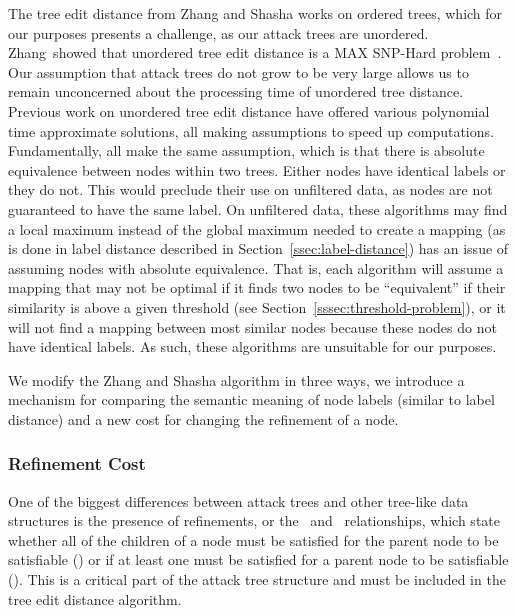 The tree edit distance from Zhang and Shasha works on ordered trees, which for our purposes presents a challenge, as our attack trees are unordered. Zhang~\etal showed that unordered tree edit distance is a MAX SNP-Hard problem~\cite{zhang_max_1994}. Our assumption that attack trees do not grow to be very large allows us to remain unconcerned about the processing time of unordered tree distance. Previous work on unordered tree edit distance have offered various polynomial time approximate solutions, all making assumptions to speed up computations. Fundamentally, all make the same assumption, which is that there is absolute equivalence between nodes within two trees. Either nodes have identical labels or they do not. This would preclude their use on unfiltered data, as nodes are not guaranteed to have the same label. On unfiltered data, these algorithms may find a local maximum instead of the global maximum needed to create a mapping (as is done in label distance described in Section~\ref{ssec:label-distance}) has an issue of assuming nodes with absolute equivalence. That is, each algorithm will assume a mapping that may not be optimal if it finds two nodes to be ``equivalent'' if their similarity is above a given threshold (see Section~\ref{sssec:threshold-problem}), or it will not find a mapping between most similar nodes because these nodes do not have identical labels. As such, these algorithms are unsuitable for our purposes.


We modify the Zhang and Shasha algorithm in three ways, we introduce a mechanism for comparing the semantic meaning of node labels (similar to label distance) and  a new cost for changing the refinement of a node.



\subsubsection{Refinement Cost}
One of the biggest differences between attack trees and other tree-like data structures is the presence of refinements, or the \AND\ and \OR\ relationships, which state whether all of the children of a node must be satisfied for the parent node to be satisfiable (\AND) or if at least one must be satisfied for a parent node to be satisfiable (\OR). This is a critical part of the attack tree structure and must be included in the tree edit distance algorithm.




